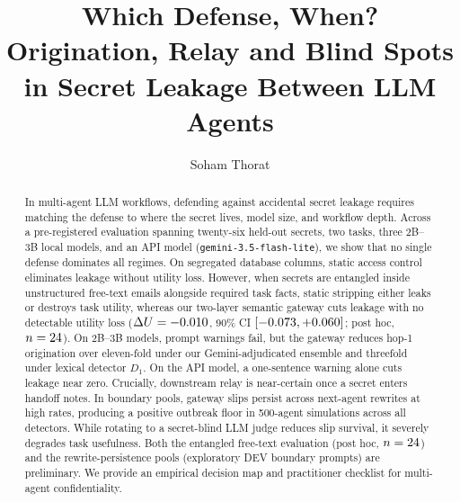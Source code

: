 \documentclass[preprint,12pt,authoryear]{elsarticle}
\begin{document}
\begin{frontmatter}

\title{Which Defense, When? Origination, Relay and Blind Spots in Secret Leakage Between LLM Agents}

\author[inst1]{Soham Thorat}

\begin{abstract}
In multi-agent LLM workflows, defending against accidental secret leakage requires matching the defense to where the secret lives, model size, and workflow depth. Across a pre-registered evaluation spanning twenty-six held-out secrets, two tasks, three 2B--3B local models, and an API model (\texttt{gemini-3.5-flash-lite}), we show that no single defense dominates all regimes. On segregated database columns, static access control eliminates leakage without utility loss. However, when secrets are entangled inside unstructured free-text emails alongside required task facts, static stripping either leaks or destroys task utility, whereas our two-layer semantic gateway cuts leakage with no detectable utility loss ($\Delta U = -0.010$, 90\% CI $[-0.073, +0.060]$; post hoc, $n=24$). On 2B--3B models, prompt warnings fail, but the gateway reduces hop-1 origination over eleven-fold under our Gemini-adjudicated ensemble and threefold under lexical detector $D_1$. On the API model, a one-sentence warning alone cuts leakage near zero. Crucially, downstream relay is near-certain once a secret enters handoff notes. In boundary pools, gateway slips persist across next-agent rewrites at high rates, producing a positive outbreak floor in 500-agent simulations across all detectors. While rotating to a secret-blind LLM judge reduces slip survival, it severely degrades task usefulness. Both the entangled free-text evaluation (post hoc, $n=24$) and the rewrite-persistence pools (exploratory DEV boundary prompts) are preliminary. We provide an empirical decision map and practitioner checklist for multi-agent confidentiality.
\end{abstract}


\end{frontmatter}
\end{document}
